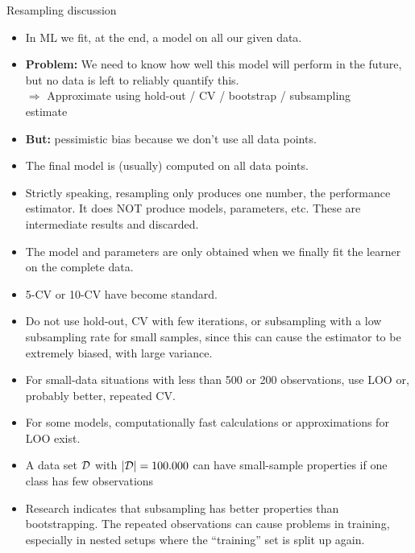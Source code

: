 \documentclass[11pt,compress,t,notes=noshow, xcolor=table]{beamer}
\begin{document}
\begin{vbframe}{Resampling discussion}

\begin{itemize}

  \item In ML we fit, at the end, a model on all our given data.\\

  \item \textbf{Problem:} We need to know how well this model will perform in 
  the future, but no data is left to reliably quantify this.\\
  $\Rightarrow$ Approximate using hold-out / CV / bootstrap / subsampling \\
  estimate\\ 

  \item \textbf{But:} pessimistic bias because we don't use all data points.\\

  \item The final model is (usually) computed on all data points.

  \item Strictly speaking, resampling only produces one number, the performance 
  estimator.
  It does NOT produce models, parameters, etc. These are intermediate results 
  and discarded.
  
  \item The model and parameters are only obtained when we finally fit the 
  learner on the complete data.

\end{itemize}

\framebreak

\begin{itemize}
  \item 5-CV or 10-CV have become standard.
  \item Do not use hold-out, CV with few iterations, or subsampling with a low 
  subsampling rate for small samples, since this can cause the estimator to be 
  extremely biased, with large variance.
  \item For small-data situations with less than 500 or 200 observations, use 
  LOO or, probably better, repeated CV.
  \item For some models, computationally fast calculations or approximations 
  for LOO exist.
  \item A data set $\mathcal{D}$ with $|\mathcal{D}| = 100.000$ can have small-sample properties 
  if one class has few observations 
  \item Research indicates that subsampling has better properties than
    bootstrapping. The repeated observations can cause problems in training,
    especially in nested setups where the \enquote{training} set is split up again.
\end{itemize}


\end{vbframe}
\end{document}
